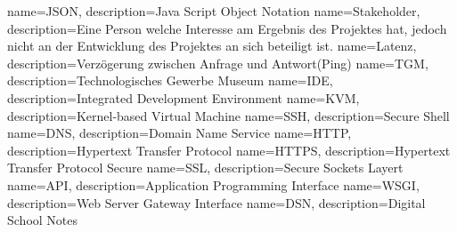 \makeglossaries
{} {name=JSON, description={Java Script Object Notation}}
 {name=Stakeholder, description={Eine Person welche Interesse am Ergebnis des Projektes hat, jedoch nicht an der Entwicklung des Projektes an sich beteiligt ist.}}
 {name=Latenz, description={Verzögerung zwischen Anfrage und Antwort(Ping)}}
 {name=TGM, description={Technologisches Gewerbe Museum}}
 {name=IDE, description={Integrated Development Environment}}
 {name=KVM, description={Kernel-based Virtual Machine}}
 {name=SSH, description={Secure Shell}}
 {name=DNS, description={Domain Name Service}}
 {name=HTTP, description={Hypertext Transfer Protocol}}
 {name=HTTPS, description={Hypertext Transfer Protocol Secure}}
 {name=SSL, description={Secure Sockets Layert}}
 {name=API, description={Application Programming Interface}}
 {name=WSGI, description={Web Server Gateway Interface}}
 {name=DSN, description={Digital School Notes}}

\renewcommand*\glspostdescription{\dotfill}


